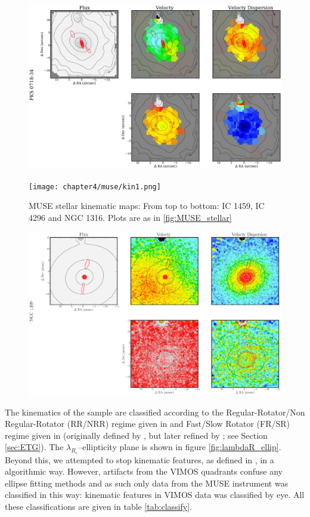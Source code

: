 		\begin{figure}
			\centering
			\includegraphics[height=0.31\textheight]{chapter4/vimos/kin4.png}
		\end{figure}


		\begin{figure}
			\centering
			\texttt{[image: chapter4/muse/kin1.png]}
			\caption[MUSE stellar kinematic maps]{MUSE stellar kinematic maps: From top to bottom: IC 1459, IC 4296 and NGC 1316. Plots are as in \ref{fig:MUSE_stellar}}
			\label{fig:VIMOS_stellar}
		\end{figure}
		\begin{figure}
			\centering
			\includegraphics[height=0.31\textheight]{chapter4/muse/kin2.png}
		\end{figure}

		
		The kinematics of the sample are classified according to the Regular-Rotator/Non Regular-Rotator (RR/NRR) regime given in \citet{Krajnovic2011} and Fast/Slow Rotator (FR/SR) regime given in \citet{Cappellari2016} (originally defined by \citealt{Emsellem2011}, but later refined by \citealt{Cappellari2016}; see Section \ref{sec:ETG}). The $\lambda_{R_e}$--ellipticity plane is shown in figure \ref{fig:lambdaR_ellip}. Beyond this, we attempted to stop kinematic features, as defined in \citet{Krajnovic2011}, in a algorithmic way. However, artifacts from the VIMOS quadrants confuse any ellipse fitting methods and as such only data from the MUSE instrument was classified in this way: kinematic features in VIMOS data was classified by eye. All these classifications are given in table \ref{tab:classify}. 


